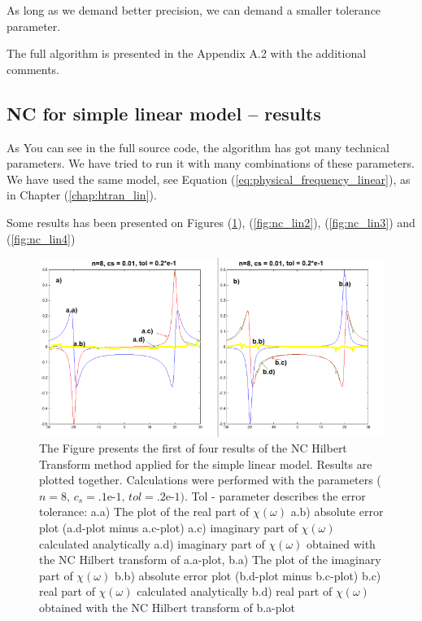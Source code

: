 \documentclass[12pt,twoside,a4paper]{article}
\numberwithin{equation}{subsection}
\numberwithin{figure}{subsection}
\begin{document}
As long as we demand better precision, we can demand a smaller tolerance parameter. 

The full algorithm is presented in the Appendix A.2 with the additional comments. 

\subsection{NC for simple linear model -- results} \label{chap:nc_lin}

As You can see in the full source code, the algorithm has got many technical parameters. We have tried to run it with many combinations of these parameters. We have used the same model, see Equation (\ref{eq:physical_frequency_linear}), as in Chapter (\ref{chap:htran_lin}).

Some results has been presented on Figures (\ref{fig:nc_lin1}), (\ref{fig:nc_lin2}), (\ref{fig:nc_lin3}) and (\ref{fig:nc_lin4})

\begin{figure}
  \includegraphics[width=150mm]{img/nc_lin1.png}
   \caption{ The Figure presents the first of four results of the NC Hilbert Transform method applied for the simple linear model. Results are plotted together. Calculations were performed with the parameters ($n = 8, \, c_s = \mbox{.1e-1}, \, tol = \mbox{.2e-1})$. Tol - parameter describes the error tolerance:
     a.a) The plot of the real part of $\chi (\omega )$ 
     a.b) absolute error plot (a.d-plot minus a.c-plot) 
     a.c) imaginary part of $\chi (\omega )$ calculated analytically 
     a.d) imaginary part of $\chi (\omega )$ obtained with the NC Hilbert transform of a.a-plot, 
     b.a) The plot of the imaginary part of $\chi (\omega )$ 
     b.b) absolute error plot (b.d-plot minus b.c-plot) 
     b.c) real part of $\chi (\omega )$ calculated analytically 
     b.d) real part of $\chi (\omega )$ obtained with the NC Hilbert transform of b.a-plot 
     \label{fig:nc_lin1}
  }
\end{figure}
\end{document}
